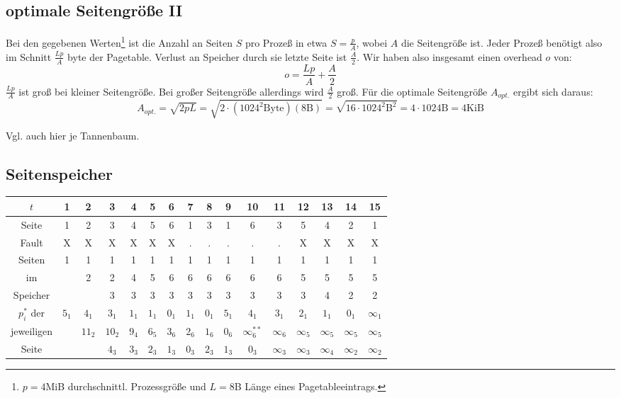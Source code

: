 \documentclass[ngerman]{fbi-aufgabenblatt}
\begin{document}
\subsection{optimale Seitengröße II}

Bei den gegebenen Werten\footnote{$p =4$MiB durchschnittl. Prozessgröße und $L=8$B Länge eines Pagetableeintrags.}
ist die Anzahl an Seiten $S$ pro Prozeß in etwa $S = \frac pA$, wobei $A$ die Seitengröße ist. Jeder Prozeß benötigt
also im Schnitt $\frac {Lp}A$ byte der Pagetable. Verlust an Speicher durch 
sie letzte Seite ist $\frac A 2$. Wir haben also insgesamt einen overhead $o$ von:
$$o= \frac {Lp} A + \frac A 2$$
$\frac {Lp}A$ ist groß bei kleiner Seitengröße. Bei großer Seitengröße allerdings wird $\frac A2$ groß. Für die optimale
Seitengröße $A_{opt.}$ ergibt sich daraus:
$$A_{opt.} = \sqrt{2pL} = \sqrt{2\cdot (1024^2\text{Byte})(8\text{B})} = \sqrt{16\cdot 1024^2 \text{B}^2} = 4\cdot 1024 \text{B} = 4\text{KiB} $$

Vgl. auch hier je Tannenbaum.\footnotemark[3]


\subsection{Seitenspeicher}


 \begin{tabular}{c||c|c|c|c|c|c|c|c|c|c|c|c|c|c|c}
 $t$ 		& 1 	& 2 	& 3 	& 4 	& 5 	& 6 	& 7 	& 8 	& 9 	& 10 			& 11 		& 12 		& 13 		& 14 		& 15 \\\hline 
 Seite 		& 1 	& 2 	& 3 	& 4 	& 5 	& 6 	& 1 	& 3 	& 1 	&  6 			&  3 		&  5 		&  4 		&  2 		&  1 \\\hline 
 Fault		& X 	& X 	& X 	& X 	& X 	& X 	& . 	& . 	& . 	&  . 			&  . 		&  X 		&  X 		&  X 		&  X \\\hline 
 Seiten		& 1 	& 1 	& 1 	& 1 	& 1 	& 1 	& 1 	& 1 	& 1 	&  1 			&  1 		&  1 		&  1 		&  1 		&  1 \\
 im		&   	& 2 	& 2 	& 4 	& 5 	& 6 	& 6 	& 6 	& 6 	&  6 			&  6 		&  5 		&  5 		&  5 		&  5 \\
 Speicher	&   	&   	& 3 	& 3 	& 3 	& 3 	& 3 	& 3 	& 3 	&  3 			&  3 		&  3 		&  4 		&  2 		&  2 \\\hline
 $p_i^*$ der	& $5_1$ & $4_1$ & $3_1$ & $1_1$ & $1_1$	& $0_1$ & $1_1$ & $0_1$ & $5_1$ &  $4_1$ 		&  $3_1$ 	&  $2_1$ 	&  $1_1$ 	&  $0_1$ 	&  $\infty_1$ \\
 jeweiligen	&   	& $11_2$& $10_2$& $9_4$	& $6_5$ & $3_6$ & $2_6$ & $1_6$ & $0_6$ &  $\infty_6^{**}$ 	&  $\infty_6$ 	&  $\infty_5$ 	&  $\infty_5$ 	& $\infty_5$ 	&  $\infty_5$ \\
 Seite		&   	&   	& $4_3$	& $3_3$	& $2_3$ & $1_3$ & $0_3$ & $2_3$ & $1_3$ &  $0_3$ 		&  $\infty_3$ 	&  $\infty_3$ 	&  $\infty_4$ 	& $\infty_2$ 	&  $\infty_2$ \\
 \end{tabular}
 
\end{document}
